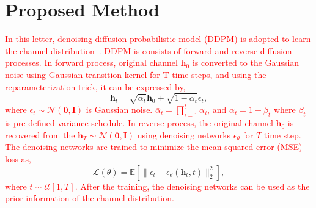\documentclass[lettersize,journal]{IEEEtran}
\begin{document}
\section{Proposed Method}

\textcolor{red}{
In this letter, denoising diffusion probabilistic model (DDPM) is adopted to learn the channel distribution~\cite{hoDenoisingDiffusionProbabilistic2020}. DDPM is consists of forward and reverse diffusion processes. In forward process, original channel $\mathbf{h}_{0}$ is converted to the Gaussian noise using Gaussian transition kernel for T time steps, and using the reparameterization trick, it can be expressed by,
}
\begin{equation}
\mathbf{h}_{t} = \sqrt{ \bar{\alpha}_{t} }\mathbf{h}_{0} + \sqrt{ 1-\bar{\alpha}_{t} }\epsilon_{t},
\end{equation}
\textcolor{red}{
where $\epsilon_{t}\sim\mathcal{N}(\mathbf{0},\mathbf{I})$ is Gaussian noise. $\bar{\alpha}_{t}=\prod_{i=1}^{t}\alpha_{i}$, and $\alpha_{t}=1-\beta_{t}$ where $\beta_{t}$ is pre-defined variance schedule. In reverse process, the original channel $\mathbf{h}_{0}$ is recovered from the $\mathbf{h}_{T}\sim\mathcal{N}(\mathbf{0},\mathbf{I})$ using denoising networks $\epsilon_{\theta}$ for $T$ time step. The denoising networks are trained to minimize the mean squared error (MSE) loss as,
}
\begin{equation}
\mathcal{L}(\theta) = \mathbb{E}[\|\epsilon_{t} - \epsilon_{\theta}(\mathbf{h}_{t},t)\|_{2}^{2}],
\end{equation}
\textcolor{red}{
where $t\sim\mathcal{U}[1,T]$. After the training, the denoising networks can be used as the prior information of the channel distribution.
}
\end{document}
